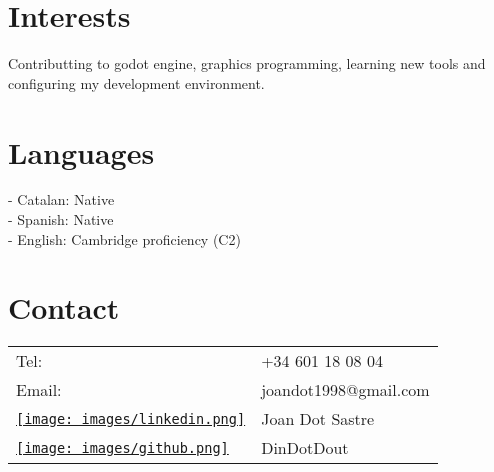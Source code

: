 \documentclass[9pt,oneside,a4paper,titlepage]{article}
\begin{document}
\begin{tcolorbox}
\begin{minipage}[t]{8cm}
\begin{tcolorbox}[grow to left by=0.6cm,colback=gray!25,colframe=white,height fill]
			\section*{Interests}
			Contributting to godot engine, graphics programming, learning new tools and configuring
			my development environment.
			\section*{Languages}
			- Catalan: Native \\
			- Spanish: Native \\
			- English: Cambridge proficiency (C2)
			\section*{Contact}
			\begin{tabular}{l l}
				Tel:                                                                                                                      & +34 601 18 08 04      \\
				Email:                                                                                                                    & joandot1998@gmail.com \\
				\href{https://www.linkedin.com/in/joan-dot-sastre-50860a198/}{\protect\texttt{[image: images/linkedin.png]}} & Joan Dot Sastre       \\
				\href{https://github.com/DinDotDout}{\protect\texttt{[image: images/github.png]}}                            & DinDotDout            \\
			\end{tabular}
		\end{tcolorbox}
	\end{minipage}
	\begin{minipage}[t]{11cm}
		\vspace*{-0.5cm}
		\begin{tcolorbox}[grow to right by=0.75cm, colframe=white,colback=white]

\end{tcolorbox}
\end{minipage}
\end{tcolorbox}
\end{document}
